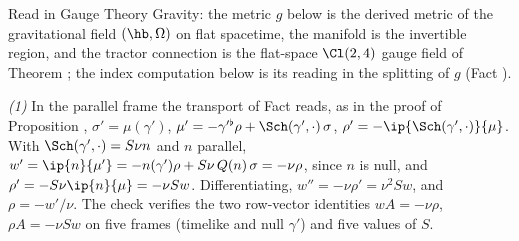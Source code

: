 Read in Gauge Theory Gravity: the metric $g$ below is the derived metric of the gravitational field $(\hb, \Omega)$ on flat spacetime, the manifold is the invertible region, and the tractor connection is the flat-space $\Cl(2,4)$ gauge field of Theorem ; the index computation below is its reading in the splitting of $g$ (Fact ).

\emph{(1)} In the parallel frame the transport of Fact  reads, as in the proof of Proposition , $\sigma' = \mu(\gamma')$, $\mu' = -\gamma'^{\flat}\rho + \Sch(\gamma',\cdot)\,\sigma$, $\rho' = -\ip{\Sch(\gamma',\cdot)}{\mu}$. With $\Sch(\gamma',\cdot) = S\nu n$ and $n$ parallel, $w' = \ip{n}{\mu'} = -n(\gamma')\rho + S\nu\,Q(n)\,\sigma = -\nu\rho$, since $n$ is null, and $\rho' = -S\nu\ip{n}{\mu} = -\nu S w$. Differentiating, $w'' = -\nu\rho' = \nu^2 S w$, and $\rho = -w'/\nu$. The check verifies the two row-vector identities $wA = -\nu\rho$, $\rho A = -\nu S w$ on five frames (timelike and null $\gamma'$) and five values of $S$.

